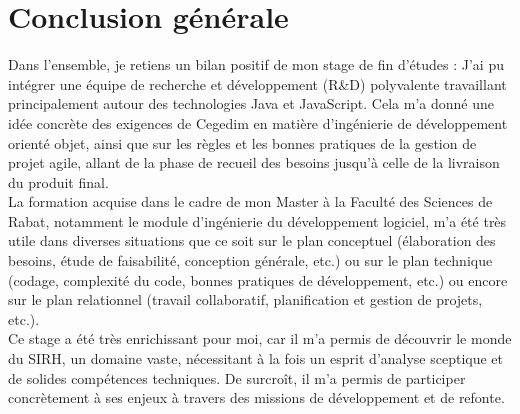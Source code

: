 
{}
\section*{Conclusion générale}

Dans l'ensemble, je retiens un bilan positif de mon stage de fin d'études : J'ai pu intégrer une équipe de recherche et développement (R\&D) polyvalente travaillant principalement autour des technologies Java et JavaScript. Cela m'a donné une idée concrète des exigences de Cegedim en matière d'ingénierie de développement orienté objet, ainsi que sur les règles et les bonnes pratiques de la gestion de projet agile, allant de la phase de recueil des besoins jusqu'à celle de la livraison du produit final.\\

La formation acquise dans le cadre de mon Master à la Faculté des Sciences de Rabat, notamment le module d'ingénierie du développement logiciel, m'a été très utile dans diverses situations que ce soit sur le plan conceptuel (élaboration des besoins, étude de faisabilité, conception générale, etc.) ou sur le plan technique (codage, complexité du code, bonnes pratiques de développement, etc.) ou encore sur le plan relationnel (travail collaboratif, planification et gestion de projets, etc.).\\
Ce stage a été très enrichissant pour moi, car il m'a permis de découvrir le monde du SIRH, un domaine vaste, nécessitant à la fois un esprit d'analyse sceptique et de solides compétences techniques. De surcroît, il m'a permis de participer concrètement à ses enjeux à travers des missions de développement et de refonte.